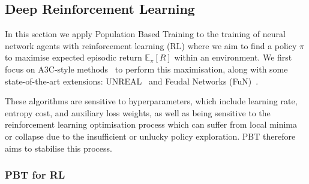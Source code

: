 \documentclass{article} %
\begin{document}
\subsection{Deep Reinforcement Learning}\label{sec:deeprl}
In this section we apply Population Based Training to the training of neural network agents with reinforcement learning (RL)
%
where we aim to find a policy $\pi$ to maximise expected episodic return $\mathbb{E}_\pi[R]$ within an environment. 
%
We first focus on A3C-style methods~\cite{mnih2016asynchronous} to perform this maximisation, along with some state-of-the-art extensions: UNREAL~\citep{jaderberg2016reinforcement} and Feudal Networks (FuN)~\citep{vezhnevets2017feudal}.

These algorithms are sensitive to hyperparameters, which include learning rate, entropy cost, and auxiliary loss weights, as well as being sensitive to the reinforcement learning optimisation process which can suffer from local minima or collapse due to the insufficient or unlucky policy exploration. PBT therefore aims to stabilise this process.

\subsubsection{PBT for RL}\label{sec:pbtforrl}
\end{document}
